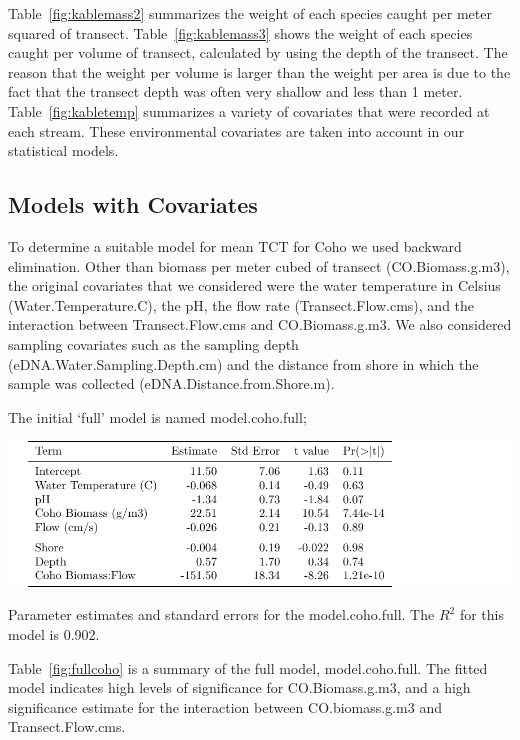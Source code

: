 Table~\ref{fig:kablemass2} summarizes the weight of each species caught per meter squared of transect. Table~\ref{fig:kablemass3} shows the weight of each species caught per volume of transect, calculated by using the depth of the transect. The reason that the weight per volume is larger than the weight per area is due to the fact that the transect depth was often very shallow and less than 1 meter. Table~\ref{fig:kabletemp} summarizes a variety of covariates that were recorded at each stream. These environmental covariates are taken into account in our statistical models. 


\newpage

\subsection{Models with Covariates}

To determine a suitable model for mean TCT for Coho we used backward elimination. Other than biomass per meter cubed of transect (CO.Biomass.g.m3), the original covariates that we considered were the water temperature in Celsius (Water.Temperature.C), the pH, the flow rate (Transect.Flow.cms), and the interaction between Transect.Flow.cms and CO.Biomass.g.m3. We also considered sampling covariates such as the sampling depth (eDNA.Water.Sampling.Depth.cm) and the distance from shore in which the sample was collected (eDNA.Distance.from.Shore.m).

\vspace{5mm}

The initial `full' model is named model.coho.full;

\vspace{5mm}

\begin{table}[H]
\includegraphics{Chapter5Images/cohofull.pdf}
\caption{\hspace{1mm}Parameter estimates and standard errors for the model.coho.full. The $R^{2}$ for this model is 0.902. }
\label{fig:fullcoho}
\end{table}

Table~\ref{fig:fullcoho} is a summary of the full model, model.coho.full. The fitted model indicates high levels of significance for CO.Biomass.g.m3, and a high significance estimate for the interaction between CO.biomass.g.m3 and Transect.Flow.cms.

